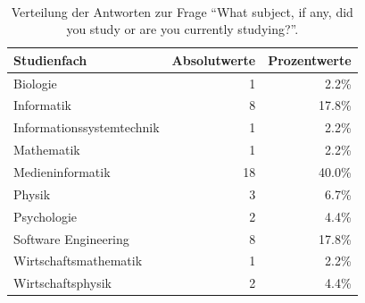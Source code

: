 \begin{table}
	\caption{Verteilung der Antworten zur Frage "`What subject, if any, did you study or are you currently studying?"'.}~\label{tab:sc_results_study}
	
	\setlength\tabcolsep{3pt}
	\renewcommand{\arraystretch}{1.4}%
	\begin{tabularx}{\textwidth}{ | x || r | r | }
		\hline
		Studienfach & Absolutwerte & Prozentwerte \\ \hline\hline
		Biologie & 1 & 2.2\% \\ \hline
		Informatik & 8 & 17.8\% \\ \hline
		Informationssystemtechnik & 1 & 2.2\% \\ \hline
		Mathematik & 1 & 2.2\% \\ \hline
		Medieninformatik & 18 & 40.0\% \\ \hline
		Physik & 3 & 6.7\% \\ \hline
		Psychologie & 2 & 4.4\% \\ \hline
		Software Engineering & 8 & 17.8\% \\ \hline
		Wirtschaftsmathematik & 1 & 2.2\% \\ \hline
		Wirtschaftsphysik & 2 & 4.4\% \\ \hline
	\end{tabularx}
\end{table}

